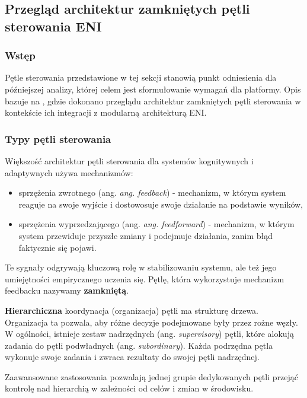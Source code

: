 \subsection{Przegląd architektur zamkniętych pętli sterowania ENI}\hypertarget{sec:25}{}

\subsubsection{Wstęp}

Pętle sterowania przedstawione w tej sekcji stanowią punkt odniesienia dla późniejszej analizy, której celem jest sformułowanie wymagań dla platformy. Opis bazuje na \cite{etsieni2024}, gdzie dokonano przeglądu architektur zamkniętych pętli sterowania w kontekście ich integracji z modularną architekturą ENI.

\subsubsection{Typy pętli sterowania}

Większość architektur pętli sterowania dla systemów kognitywnych i adaptywnych używa mechanizmów:
\begin{itemize}
    \item sprzężenia zwrotnego (ang. \textit{ang. feedback}) - mechanizm, w którym system reaguje na swoje wyjście i dostowosuje swoje działanie na podstawie wyników,
    \item sprzężenia wyprzedzającego (ang. \textit{ang. feedforward}) - mechanizm, w którym system przewiduje przyszłe zmiany i podejmuje działania, zanim błąd faktycznie się pojawi.
\end{itemize}

Te sygnały odgrywają kluczową rolę w stabilizowaniu systemu, ale też jego umiejętności empirycznego uczenia się. Pętlę, która wykorzystuje mechanizm feedbacku nazywamy \textbf{zamkniętą}.

\textbf{Hierarchiczna} koordynacja (organizacja) pętli ma strukturę drzewa. Organizacja ta pozwala, aby różne decyzje podejmowane były przez rożne węzły. W ogólności, istnieje zestaw nadrzędnych (ang. \textit{supervisory}) pętli, które alokują zadania do pętli podwładnych (ang. \textit{subordinary}). Każda podrzędna pętla wykonuje swoje zadania i zwraca rezultaty do swojej pętli nadrzędnej. 

Zaawansowane zastosowania pozwalają jednej grupie dedykowanych pętli przejąć kontrolę nad hierarchią w zależności od celów i zmian w środowisku. 


